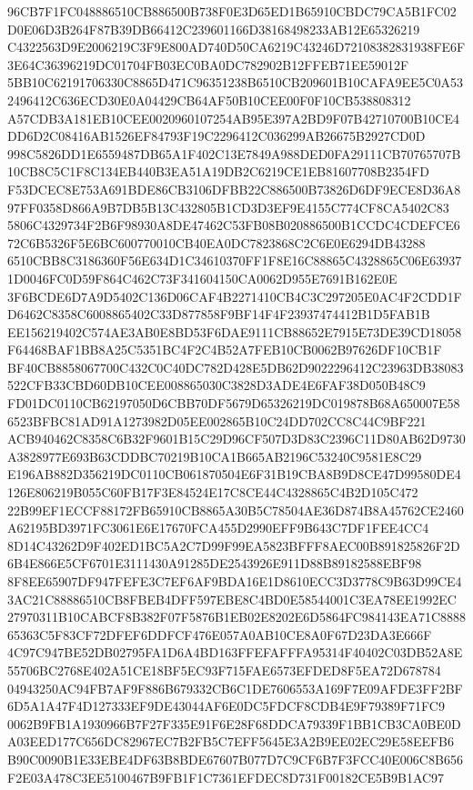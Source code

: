 \documentclass[UTF8,fontset=fandol,zihao=-4,a4paper]{ctexart}
\begin{document}
{{96CB7F1FC048886510CB886500B738F0E3D65ED1B65910CBDC79CA5B1FC02D0E06D3B264F87B39DB66412C239601166D38168498233AB12E65326219
C4322563D9E2006219C3F9E800AD740D50CA6219C43246D72108382831938FE6F3E64C36396219DC01704FB03EC0BA0DC782902B12FFEB71EE59012F
5BB10C62191706330C8865D471C96351238B6510CB209601B10CAFA9EE5C0A532496412C636ECD30E0A04429CB64AF50B10CEE00F0F10CB538808312
A57CDB3A181EB10CEE0020960107254AB95E397A2BD9F07B42710700B10CE4DD6D2C08416AB1526EF84793F19C2296412C036299AB26675B2927CD0D
998C5826DD1E6559487DB65A1F402C13E7849A988DED0FA29111CB70765707B10CB8C5C1F8C134EB440B3EA51A19DB2C6219CE1EB81607708B2354FD
F53DCEC8E753A691BDE86CB3106DFBB22C886500B73826D6DF9ECE8D36A897FF0358D866A9B7DB5B13C432805B1CD3D3EF9E4155C774CF8CA5402C83
5806C4329734F2B6F98930A8DE47462C53FB08B020886500B1CCDC4CDEFCE672C6B5326F5E6BC600770010CB40EA0DC7823868C2C6E0E6294DB43288
6510CBB8C3186360F56E634D1C34610370FF1F8E16C88865C4328865C06E639371D0046FC0D59F864C462C73F341604150CA0062D955E7691B162E0E
3F6BCDE6D7A9D5402C136D06CAF4B2271410CB4C3C297205E0AC4F2CDD1FD6462C8358C6008865402C33D877858F9BF14F4F23937474412B1D5FAB1B
EE156219402C574AE3AB0E8BD53F6DAE9111CB88652E7915E73DE39CD18058F64468BAF1BB8A25C5351BC4F2C4B52A7FEB10CB0062B97626DF10CB1F
BF40CB8858067700C432C0C40DC782D428E5DB62D9022296412C23963DB38083522CFB33CBD60DB10CEE008865030C3828D3ADE4E6FAF38D050B48C9
FD01DC0110CB62197050D6CBB70DF5679D65326219DC019878B68A650007E586523BFBC81AD91A1273982D05EE002865B10C24DD702CC8C44C9BF221
ACB940462C8358C6B32F9601B15C29D96CF507D3D83C2396C11D80AB62D9730A3828977E693B63CDDBC70219B10CA1B665AB2196C53240C9581E8C29
E196AB882D356219DC0110CB061870504E6F31B19CBA8B9D8CE47D99580DE4126E806219B055C60FB17F3E84524E17C8CE44C4328865C4B2D105C472
22B99EF1ECCF88172FB65910CB8865A30B5C78504AE36D874B8A45762CE2460A62195BD3971FC3061E6E17670FCA455D2990EFF9B643C7DF1FEE4CC4
8D14C43262D9F402ED1BC5A2C7D99F99EA5823BFFF8AEC00B891825826F2D6B4E866E5CF6701E3111430A91285DE2543926E911D88B89182588EBF98
8F8EE65907DF947FEFE3C7EF6AF9BDA16E1D8610ECC3D3778C9B63D99CE43AC21C88886510CB8FBEB4DFF597EBE8C4BD0E58544001C3EA78EE1992EC
27970311B10CABCF8B382F07F5876B1EB02E8202E6D5864FC984143EA71C888865363C5F83CF72DFEF6DDFCF476E057A0AB10CE8A0F67D23DA3E666F
4C97C947BE52DB02795FA1D6A4BD163FFEFAFFFA95314F40402C03DB52A8E55706BC2768E402A51CE18BF5EC93F715FAE6573EFDED8F5EA72D678784
04943250AC94FB7AF9F886B679332CB6C1DE7606553A169F7E09AFDE3FF2BF6D5A1A47F4D127333EF9DE43044AF6E0DC5FDCF8CDB4E9F79389F71FC9
0062B9FB1A1930966B7F27F335E91F6E28F68DDCA79339F1BB1CB3CA0BE0DA03EED177C656DC82967EC7B2FB5C7EFF5645E3A2B9EE02EC29E58EEFB6
B90C0090B1E33EBE4DF63B8BDE67607B077D7C9CF6B7F3FCC40E006C8B656F2E03A478C3EE5100467B9FB1F1C7361EFDEC8D731F00182CE5B9B1AC97
}}
\end{document}
